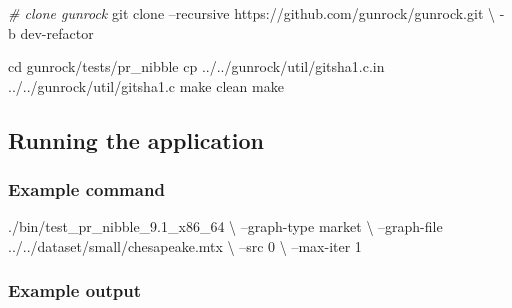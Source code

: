 \documentclass[10pt,oneside]{memoir}
\newenvironment{Shaded}{}{}
\newcommand{\BuiltInTok}[1]{#1}
\newcommand{\CommentTok}[1]{\textcolor[rgb]{0.38,0.63,0.69}{\textit{#1}}}
\newcommand{\ExtensionTok}[1]{#1}
\newcommand{\FunctionTok}[1]{\textcolor[rgb]{0.02,0.16,0.49}{#1}}
\newcommand{\NormalTok}[1]{#1}
\begin{document}
\begin{Shaded}
\begin{Highlighting}[]
\CommentTok{# clone gunrock}
\FunctionTok{git}\NormalTok{ clone --recursive https://github.com/gunrock/gunrock.git \textbackslash{}}
\NormalTok{        -b dev-refactor}

\BuiltInTok{cd}\NormalTok{ gunrock/tests/pr_nibble}
\FunctionTok{cp}\NormalTok{ ../../gunrock/util/gitsha1.c.in ../../gunrock/util/gitsha1.c}
\FunctionTok{make}\NormalTok{ clean}
\FunctionTok{make}
\end{Highlighting}
\end{Shaded}

\hypertarget{running-the-application-5}{%
\subsection{Running the application}\label{running-the-application-5}}

\hypertarget{example-command-3}{%
\subsubsection{Example command}\label{example-command-3}}

\begin{Shaded}
\begin{Highlighting}[]
\ExtensionTok{./bin/test_pr_nibble_9.1_x86_64}\NormalTok{ \textbackslash{}}
\NormalTok{    --graph-type market \textbackslash{}}
\NormalTok{    --graph-file ../../dataset/small/chesapeake.mtx \textbackslash{}}
\NormalTok{    --src 0 \textbackslash{}}
\NormalTok{    --max-iter 1}
\end{Highlighting}
\end{Shaded}

\hypertarget{example-output-2}{%
\subsubsection{Example output}\label{example-output-2}}
\end{document}
